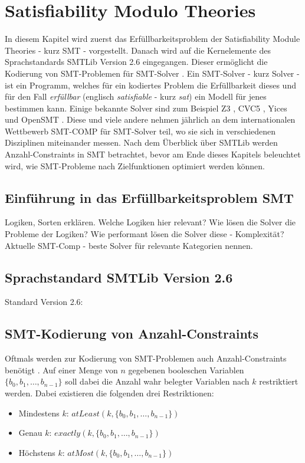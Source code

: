 \chapter{Satisfiability Modulo Theories}
\label{chapter:smt}

In diesem Kapitel wird zuerst das Erfüllbarkeitsproblem der Satisfiability Module Theories - kurz SMT - vorgestellt.
Danach wird auf die Kernelemente des Sprachstandards SMTLib Version 2.6 \cite{smtlib} eingegangen.
Dieser ermöglicht die Kodierung von SMT-Problemen für SMT-Solver \cite{smt}.
Ein SMT-Solver - kurz Solver - ist ein Programm, welches für ein kodiertes Problem die Erfüllbarkeit dieses und für den
Fall \textit{erfüllbar} (englisch \textit{satisfiable} - kurz \textit{sat}) ein Modell für jenes bestimmen kann.
Einige bekannte Solver sind zum Beispiel Z3 \cite{z3}, CVC5 \cite{cvc5}, Yices \cite{yices} und OpenSMT \cite{opensmt}.
Diese und viele andere nehmen jährlich an dem internationalen Wettbewerb SMT-COMP \cite{smtcomp} für SMT-Solver teil,
wo sie sich in verschiedenen Disziplinen miteinander messen.
Nach dem Überblick über SMTLib werden Anzahl-Constraints in SMT betrachtet,
bevor am Ende dieses Kapitels beleuchtet wird, wie SMT-Probleme nach Zielfunktionen optimiert werden können.

\section{Einführung in das Erfüllbarkeitsproblem SMT}
Logiken, Sorten erklären.
Welche Logiken hier relevant?
Wie lösen die Solver die Probleme der Logiken?
Wie performant lösen die Solver diese - Komplexität?
Aktuelle SMT-Comp - beste Solver für relevante Kategorien nennen.

\section{Sprachstandard SMTLib Version 2.6}
Standard Version 2.6: \cite{smtlib}

\section{SMT-Kodierung von Anzahl-Constraints}
\label{sec:smtcardinality}
Oftmals werden zur Kodierung von SMT-Problemen auch Anzahl-Constraints benötigt \cite{kovasznai}.
Auf einer Menge von $n$ gegebenen booleschen Variablen $\{b_0, b_1, \ldots, b_{n-1}\}$ soll dabei die Anzahl wahr belegter Variablen nach $k$ restriktiert werden.
Dabei existieren die folgenden drei Restriktionen:
\begin{itemize}
    \item Mindestens $k$: $atLeast(k, \{b_0, b_1, \ldots, b_{n-1}\})$
    \item Genau $k$: $exactly(k, \{b_0, b_1, \ldots, b_{n-1}\})$
    \item Höchstens $k$: $atMost(k, \{b_0, b_1, \ldots, b_{n-1}\})$
\end{itemize}

